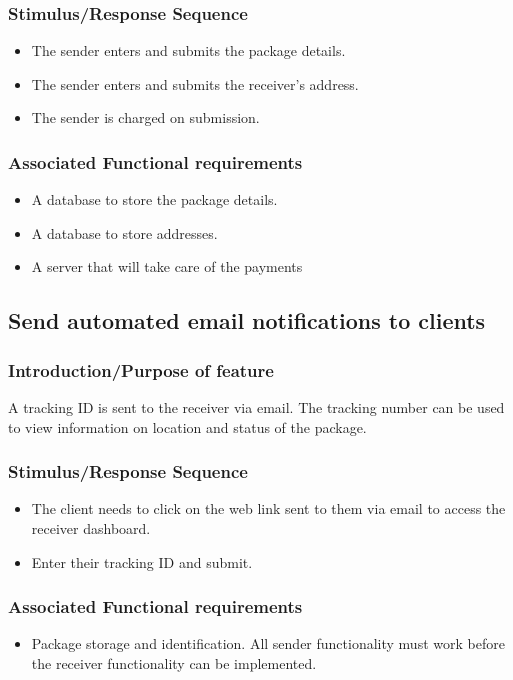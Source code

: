 \documentclass[paper=a4, fontsize=11pt]{scrartcl} %
\numberwithin{equation}{section} %
\numberwithin{figure}{section} %
\numberwithin{table}{section} %
\begin{document}
\subsubsection{Stimulus/Response Sequence}
\begin{itemize}
\item The sender enters and submits the package details.
\item The sender enters and submits the receiver's address.
\item The sender is charged on submission.
\end{itemize}
\subsubsection{Associated Functional requirements}
\begin{itemize}
\item A database to store the package details.
\item A database to store addresses.
\item A server that will take care of the payments
\end{itemize}


\subsection{Send automated email notifications to clients}
\subsubsection{Introduction/Purpose of feature}

A tracking ID is sent to the receiver via email. The tracking number can be used to view information on location and status of the package.

\subsubsection{Stimulus/Response Sequence}
\begin{itemize}
\item The client needs to click on the web link sent to them via email to access the receiver dashboard.
\item Enter their tracking ID and submit.
\end{itemize}
\subsubsection{Associated Functional requirements}
\begin{itemize}
\item Package storage and identification.
All sender functionality must work before the receiver functionality can be implemented.
\end{itemize}
\end{document}
